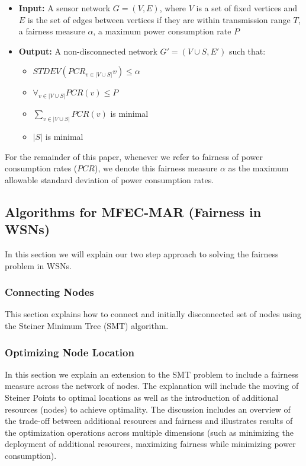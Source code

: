 \begin{itemize}
 \item \textbf{Input:} A sensor network $G = (V, E)$, where $V$ is a set of fixed vertices and $E$ is the set of edges between vertices if they are within transmission range $T$, a fairness measure $\alpha$, a maximum power consumption rate $P$

\item \textbf{Output:} A non-disconnected network $G' = (V \cup S, E')$ such that:
	\begin{itemize}
		\item $STDEV( PCR_{v \in |V \cup S|} v) \leq \alpha$
		\item $\forall_{v \in |V \cup S|} PCR(v) \leq P$
		\item $\sum_{v \in |V \cup S|} PCR(v)$ is minimal
		\item $|S|$ is minimal
	\end{itemize}
\end{itemize}

For the remainder of this paper, whenever we refer to fairness of power consumption rates ($PCR$), we denote this fairness measure $\alpha$ as the maximum allowable standard deviation of power consumption rates.


\subsection{Algorithms for MFEC-MAR (Fairness in WSNs)}
In this section we will explain our two step approach to solving the fairness problem in WSNs.

\subsubsection{Connecting Nodes}
This section explains how to connect and initially disconnected set of nodes using the Steiner Minimum Tree (SMT) algorithm.
\subsubsection{Optimizing Node Location}
In this section we explain an extension to the SMT problem to include a fairness measure across the network of nodes.
The explanation will include the moving of Steiner Points to optimal locations as well as the introduction of additional resources (nodes) to achieve optimality. The discussion includes an overview of the trade-off between additional resources and  fairness and illustrates results of the optimization operations across multiple dimensions (such as minimizing the deployment of additional resources, maximizing fairness while minimizing power consumption).

